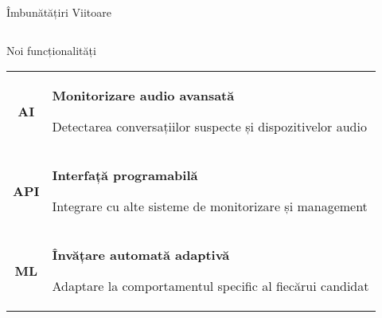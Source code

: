 \documentclass[aspectratio=169,9pt]{beamer}
\newenvironment{cardblock}[1]{%
    \begin{block}{#1}
}{%
    \end{block}
}
\begin{document}
\begin{frame}{Îmbunătățiri Viitoare}
\begin{columns}[T]
                        \begin{cardblock}{Noi funcționalități}
                                \begin{tabular}{cp{5.3cm}}
                                        \cellcolor{lightblue}\textcolor{mainblue}{\textbf{AI}} & 
                                        \begin{minipage}[t]{5.3cm}
                                                \small\textbf{Monitorizare audio avansată}
                                                
                                                \footnotesize Detectarea conversațiilor suspecte și dispozitivelor audio
                                        \end{minipage} \\[0.3cm]
                                        
                                        \cellcolor{lightblue}\textcolor{mainblue}{\textbf{API}} & 
                                        \begin{minipage}[t]{5.3cm}
                                                \small\textbf{Interfață programabilă}
                                                
                                                \footnotesize Integrare cu alte sisteme de monitorizare și management
                                        \end{minipage} \\[0.3cm]
                                        
                                        \cellcolor{lightblue}\textcolor{mainblue}{\textbf{ML}} & 
                                        \begin{minipage}[t]{5.3cm}
                                                \small\textbf{Învățare automată adaptivă}
                                                
                                                \footnotesize Adaptare la comportamentul specific al fiecărui candidat
                                        \end{minipage}
                                \end{tabular}
                        \end{cardblock}
        \end{columns}
        
        \vspace{0.1cm}
        

\end{frame}
\end{document}
